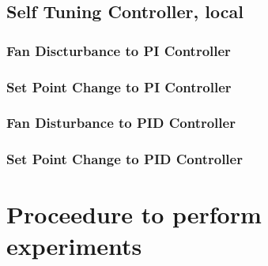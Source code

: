 \subsection{Self Tuning Controller, local}\label{selfcode_virtual}
\subsubsection{Fan Discturbance to PI Controller}
\begin{code}

\end{code}


\subsubsection{Set Point Change to PI Controller}
\begin{code}

\end{code}

\subsubsection{Fan Disturbance to PID Controller}
\begin{code}

\end{code}

\subsubsection{Set Point Change to PID Controller}
\begin{code}

\end{code}

\section{Proceedure to perform experiments}
